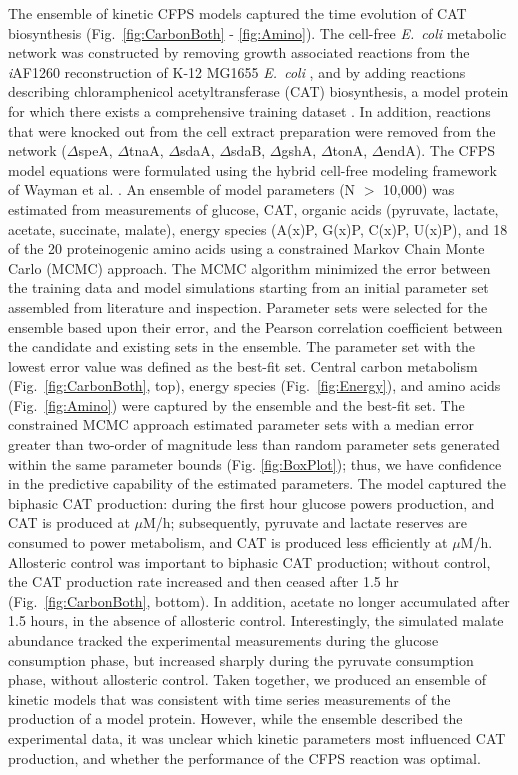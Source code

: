 \documentclass[12pt]{article}
\begin{document}
The ensemble of kinetic CFPS models captured the time evolution of CAT biosynthesis (Fig.~\ref{fig:CarbonBoth} - \ref{fig:Amino}).
The cell-free \textit{E.~coli} metabolic network was constructed by removing growth associated reactions from the \textit{i}AF1260 reconstruction of K-12 MG1655 \textit{E.~coli} \cite{Feist:2007aa}, and by adding reactions describing chloramphenicol acetyltransferase (CAT) biosynthesis, a model protein for which there exists a comprehensive training dataset \cite{2005_calhoun_BiotechnologyProgress}.
In addition, reactions that were knocked out from the cell extract preparation were removed from the network ($\Delta$speA, $\Delta$tnaA, $\Delta$sdaA, $\Delta$sdaB, $\Delta$gshA, $\Delta$tonA, $\Delta$endA).
The CFPS model equations were formulated using the hybrid cell-free modeling framework of Wayman et al. \cite{pr3010138}.
An ensemble of model parameters (N $>$ 10,000) was estimated from measurements of glucose, CAT, organic acids (pyruvate, lactate, acetate, succinate, malate), energy species (A(x)P, G(x)P, C(x)P, U(x)P), and 18 of the 20 proteinogenic amino acids using a constrained Markov Chain Monte Carlo (MCMC) approach.
The MCMC algorithm minimized the error between the training data and model simulations starting from an initial parameter set assembled from literature and inspection.
Parameter sets were selected for the ensemble based upon their error, and the Pearson correlation coefficient between the candidate and existing sets in the ensemble.
The parameter set with the lowest error value was defined as the best-fit set.
Central carbon metabolism (Fig.~\ref{fig:CarbonBoth}, top), energy species (Fig.~\ref{fig:Energy}), and amino acids (Fig.~\ref{fig:Amino}) were captured by the ensemble and the best-fit set.
The constrained MCMC approach estimated parameter sets with a median error greater than two-order of magnitude less than random parameter sets generated within
the same parameter bounds (Fig. \ref{fig:BoxPlot}); thus, we have confidence in the predictive capability of the estimated parameters.
The model captured the biphasic CAT production: during the first hour glucose powers production, and CAT is produced at  $\mu$M/h; subsequently, pyruvate and lactate reserves are consumed to power metabolism, and CAT is produced less efficiently at  $\mu$M/h.
Allosteric control was important to biphasic CAT production; without control, the CAT production rate increased and then ceased after 1.5 hr (Fig.~\ref{fig:CarbonBoth}, bottom).
In addition, acetate no longer accumulated after 1.5 hours, in the absence of allosteric control.
Interestingly, the simulated malate abundance tracked the experimental measurements during the glucose consumption phase, but increased sharply during the pyruvate consumption phase,
without allosteric control. Taken together, we produced an ensemble of kinetic models that was consistent with time series measurements of the production of a model protein.
However, while the ensemble described the experimental data, it was unclear which kinetic parameters most influenced CAT production, and whether the performance of the CFPS reaction was optimal.
\end{document}
